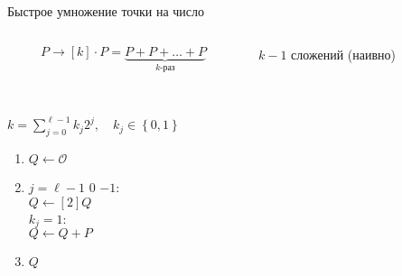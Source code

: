 \documentclass{beamer}
\begin{document}
\begin{frame}{Быстрое умножение точки на число}
    \begin{columns}
        \begin{column}{0.5\textwidth}
          \[
          P \to \left[ k \right] \cdot P = \underbrace {P + P +  \ldots  + P}_{k{\text{-раз}}}
          \]
        \end{column}
        \begin{column}{0.5\textwidth}
            \begin{center}
                \begin{tcolorbox}[enhanced,hbox,colback=box-blue-color!15,colframe=box-blue-color,title=Сложность,center title]
                    \begin{varwidth}{\textwidth}
                        \begin{center}
                            $k-1$ сложений (наивно)
                        \end{center}
                    \end{varwidth}
                \end{tcolorbox}	
            \end{center}
        \end{column}
    \end{columns}
%
    \begin{columns}
        \begin{column}{0.5\textwidth}
            \\
            $k = \sum\limits_{j = 0}^{\ell - 1} {{k_j}{2^j}} ,\quad {k_j} \in \left\{ {0,1} \right\}$\\
            \begin{enumerate}
                \item $Q \leftarrow \mathcal{O}$
                \item {} $j = \ell - 1$  $0$  $-1$:\\
                \quad$Q \leftarrow \left[ 2 \right]Q$ \\
                \quad {} ${k_j} = 1$:\\
                \quad\quad$Q \leftarrow Q + P$
                \item {} $Q$
            \end{enumerate}
        \end{column}
        \begin{column}{0.5\textwidth}
            \begin{center}

\end{center}
\end{column}
\end{columns}
\end{frame}
\end{document}
